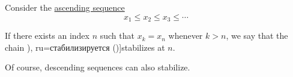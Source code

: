 \begin{definition}\label{def:stabilizing_sequence}
  Consider the \hyperref[def:order_function/ascending]{ascending sequence}
  \begin{equation*}
    x_1 \leq x_2 \leq x_3 \leq \cdots
  \end{equation*}

  If there exists an index \( n \) such that \( x_k = x_n \) whenever \( k > n \), we say that the chain \term[bg=стабилизира (\cite[41]{КоцевСидеров2016КомутативнаАлгебра}), ru=стабилизируется (\cite[52]{Яблонский2003ДискретнаяМатематика})]{stabilizes} at \( n \).
\end{definition}
\begin{comments}
  \item Of course, descending sequences can also stabilize.
\end{comments}

